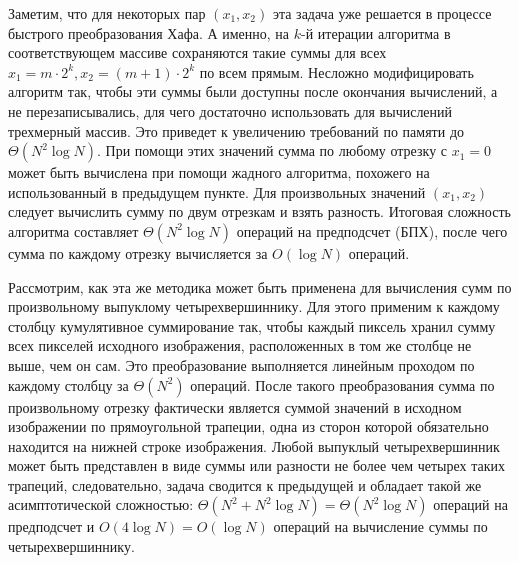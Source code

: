 Заметим, что для некоторых пар $(x_1, x_2)$ эта задача уже решается в процессе быстрого преобразования Хафа. А именно, на $k$-й итерации алгоритма в соответствующем массиве сохраняются такие суммы для всех $x_1 = m \cdot 2^k, x_2 = (m+1) \cdot 2^k$ по всем прямым. Несложно модифицировать алгоритм так, чтобы эти суммы были доступны после окончания вычислений, а не перезаписывались, для чего достаточно использовать для вычислений трехмерный массив. Это приведет к увеличению требований по памяти до $\Theta\left( N^2 \log N \right)$. При помощи этих значений сумма по любому отрезку с $x_1 = 0$ может быть вычислена при помощи жадного алгоритма, похожего на использованный в предыдущем пункте. Для произвольных значений $(x_1, x_2)$ следует вычислить сумму по двум отрезкам и взять разность. Итоговая сложность алгоритма составляет $\Theta\left( N^2 \log N \right)$ операций на предподсчет (БПХ), после чего сумма по каждому отрезку вычисляется за $O\left( \log N \right)$ операций.


Рассмотрим, как эта же методика может быть применена для вычисления сумм по произвольному выпуклому четырехвершиннику. Для этого применим к каждому столбцу кумулятивное суммирование так, чтобы каждый пиксель хранил сумму всех пикселей исходного изображения, расположенных в том же столбце не выше, чем он сам. Это преобразование выполняется линейным проходом по каждому столбцу за $\Theta\left( N^2 \right)$ операций. После такого преобразования сумма по произвольному отрезку фактически является суммой значений в исходном изображении по прямоугольной трапеции, одна из сторон которой обязательно находится на нижней строке изображения. Любой выпуклый четырехвершинник может быть представлен в виде суммы или разности не более чем четырех таких трапеций, следовательно, задача сводится к предыдущей и обладает такой же асимптотической сложностью: $\Theta\left( N^2 + N^2 \log N \right) = \Theta\left( N^2 \log N \right)$ операций на предподсчет и $O\left( 4 \log N \right) = O\left( \log N \right)$ операций на вычисление суммы по четырехвершиннику.
